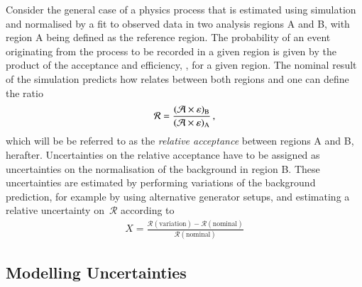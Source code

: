 Consider the general case of a physics process that is estimated using
simulation and normalised by a fit to observed data in two analysis
regions A and B, with region A being defined as the reference
region. The probability of an event originating from the process to be
recorded in a given region is given by the product of the acceptance
and efficiency, \AccTimesEff, for a given region. The nominal result
of the simulation predicts how \AccTimesEff relates between both
regions and one can define the ratio
\begin{align*}
  \mathcal{R} = \frac{(\mathcal{A} \times \varepsilon)_{\text{B}}}{(\mathcal{A} \times \varepsilon)_{\text{A}}} \,\text{,}
\end{align*}
which will be be referred to as the \emph{relative acceptance} between
regions A and B, herafter. Uncertainties on the relative acceptance
have to be assigned as uncertainties on the normalisation of the
background in region B. These
uncertainties are estimated by performing variations of the background
prediction, for example by using alternative generator setups, and
estimating a relative uncertainty on~$\mathcal{R}$ according to
\begin{align*}
  X = \frac{\mathcal{R}(\text{variation}) - \mathcal{R}(\text{nominal})}{\mathcal{R}(\text{nominal})}
\end{align*}




\subsection{Modelling Uncertainties}
\label{sec:modelling_uncertainties}







